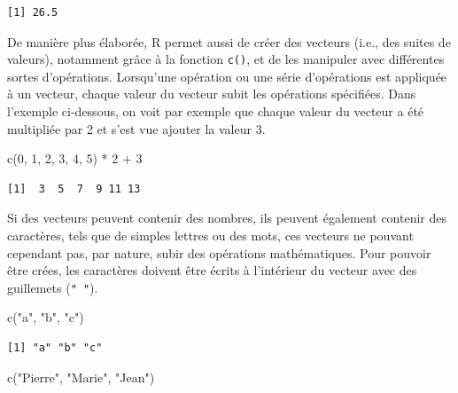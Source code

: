 \documentclass[
  letterpaper,
]{book}
\newenvironment{Shaded}{\begin{snugshade}}{\end{snugshade}}
\newcommand{\DecValTok}[1]{\textcolor[rgb]{0.68,0.00,0.00}{#1}}
\newcommand{\FunctionTok}[1]{\textcolor[rgb]{0.28,0.35,0.67}{#1}}
\newcommand{\NormalTok}[1]{\textcolor[rgb]{0.00,0.23,0.31}{#1}}
\newcommand{\SpecialCharTok}[1]{\textcolor[rgb]{0.37,0.37,0.37}{#1}}
\newcommand{\StringTok}[1]{\textcolor[rgb]{0.13,0.47,0.30}{#1}}
\begin{document}
\begin{verbatim}
[1] 26.5
\end{verbatim}

De manière plus élaborée, R permet aussi de créer des vecteurs (i.e.,
des suites de valeurs), notamment grâce à la fonction \texttt{c()}, et
de les manipuler avec différentes sortes d'opérations. Lorsqu'une
opération ou une série d'opérations est appliquée à un vecteur, chaque
valeur du vecteur subit les opérations spécifiées. Dans l'exemple
ci-dessous, on voit par exemple que chaque valeur du vecteur a été
multipliée par 2 et s'est vue ajouter la valeur 3.

\begin{Shaded}
\begin{Highlighting}[]
\FunctionTok{c}\NormalTok{(}\DecValTok{0}\NormalTok{, }\DecValTok{1}\NormalTok{, }\DecValTok{2}\NormalTok{, }\DecValTok{3}\NormalTok{, }\DecValTok{4}\NormalTok{, }\DecValTok{5}\NormalTok{) }\SpecialCharTok{*} \DecValTok{2} \SpecialCharTok{+} \DecValTok{3}
\end{Highlighting}
\end{Shaded}

\begin{verbatim}
[1]  3  5  7  9 11 13
\end{verbatim}

Si des vecteurs peuvent contenir des nombres, ils peuvent également
contenir des caractères, tels que de simples lettres ou des mots, ces
vecteurs ne pouvant cependant pas, par nature, subir des opérations
mathématiques. Pour pouvoir être crées, les caractères doivent être
écrits à l'intérieur du vecteur avec des guillemets (\texttt{"\ "}).

\begin{Shaded}
\begin{Highlighting}[]
\FunctionTok{c}\NormalTok{(}\StringTok{"a"}\NormalTok{, }\StringTok{"b"}\NormalTok{, }\StringTok{"c"}\NormalTok{)}
\end{Highlighting}
\end{Shaded}

\begin{verbatim}
[1] "a" "b" "c"
\end{verbatim}

\begin{Shaded}
\begin{Highlighting}[]
\FunctionTok{c}\NormalTok{(}\StringTok{"Pierre"}\NormalTok{, }\StringTok{"Marie"}\NormalTok{, }\StringTok{"Jean"}\NormalTok{)}
\end{Highlighting}
\end{Shaded}
\end{document}
